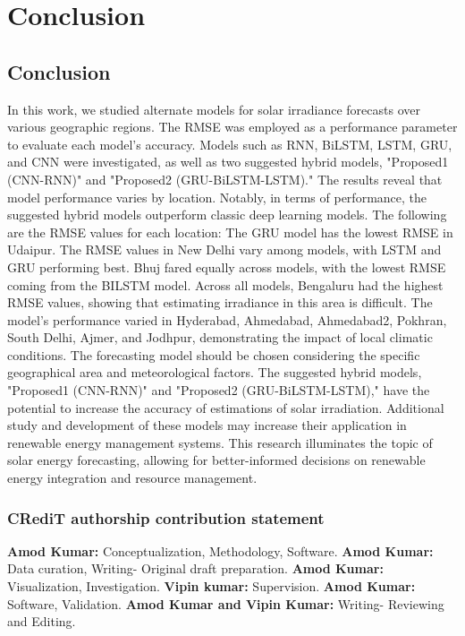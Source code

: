 
\chapter{Conclusion} %


\section{Conclusion}
In this work, we studied alternate models for solar irradiance forecasts over various geographic regions. The RMSE was employed as a performance parameter to evaluate each model's accuracy. Models such as RNN, BiLSTM, LSTM, GRU, and CNN were investigated, as well as two suggested hybrid models, "Proposed1 (CNN-RNN)" and "Proposed2 (GRU-BiLSTM-LSTM)." The results reveal that model performance varies by location. Notably, in terms of performance, the suggested hybrid models outperform classic deep learning models. The following are the RMSE values for each location:
The GRU model has the lowest RMSE in Udaipur. The RMSE values in New Delhi vary among models, with LSTM and GRU performing best. Bhuj fared equally across models, with the lowest RMSE coming from the BILSTM model. Across all models, Bengaluru had the highest RMSE values, showing that estimating irradiance in this area is difficult. The model's performance varied in Hyderabad, Ahmedabad, Ahmedabad2, Pokhran, South Delhi, Ajmer, and Jodhpur, demonstrating the impact of local climatic conditions.
The forecasting model should be chosen considering the specific geographical area and meteorological factors. The suggested hybrid models, "Proposed1 (CNN-RNN)" and "Proposed2 (GRU-BiLSTM-LSTM)," have the potential to increase the accuracy of estimations of solar irradiation. Additional study and development of these models may increase their application in renewable energy management systems. This research illuminates the topic of solar energy forecasting, allowing for better-informed decisions on renewable energy integration and resource management.


\subsection*{CRediT authorship contribution statement}
\textbf{Amod Kumar:} Conceptualization, Methodology, Software. \textbf{Amod Kumar:} Data curation, Writing- Original draft preparation. \textbf{Amod Kumar:} Visualization, Investigation. \textbf{Vipin kumar:} Supervision. \textbf{Amod Kumar:} Software, Validation. \textbf{Amod Kumar and Vipin Kumar:} Writing- Reviewing and Editing.
